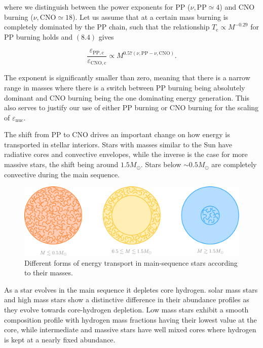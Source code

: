 \documentclass[twocolumn]{article}
\begin{document}
where we distinguish between the power exponents for PP
(\(\nu,\mathrm{PP}\simeq 4\)) and CNO burning
(\(\nu,\mathrm{CNO}\simeq 18\)). Let us assume that at a certain mass
burning is completely dominated by the PP chain, such that the
relationship \(T_\mathrm{c}\propto M^{-0.29}\) for PP burning holds and
\((8.4)\) gives

\[\frac{\varepsilon_{\mathrm{PP,c}}}{\varepsilon_{\mathrm{CNO,c}}}\propto M^{0.57(\nu,\mathrm{PP}- \nu,\mathrm{CNO})}.\]

The exponent is significantly smaller than zero, meaning that there is a
narrow range in masses where there is a switch between PP burning being
absolutely dominant and CNO burning being the one dominating energy
generation. This also serves to justify our use of either PP burning or
CNO burning for the scaling of \(\varepsilon_\mathrm{nuc}\).

The shift from PP to CNO drives an important change on how energy is
transported in stellar interiors. Stars with masses similar to the Sun
have radiative cores and convective envelopes, while the inverse is the
case for more massive stars, the shift being around \(1.5M_\odot\).
Stars below \(\sim0.5M_\odot\) are completely convective during the main
sequence.

\begin{figure}
\centering
\includegraphics{../assets/10_stellar_evo/convection.pdf}
\caption{Different forms of energy transport in main-sequence stars
according to their masses.}
\end{figure}

As a star evolves in the main sequence it depletes core hydrogen. solar
mass stars and high mass stars show a distinctive difference in their
abundance profiles as they evolve towards core-hydrogen depletion. Low
mass stars exhibit a smooth composition profile with hydrogen mass
fractions having their lowest value at the core, while intermediate and
massive stars have well mixed cores where hydrogen is kept at a nearly
fixed abundance.
\end{document}
